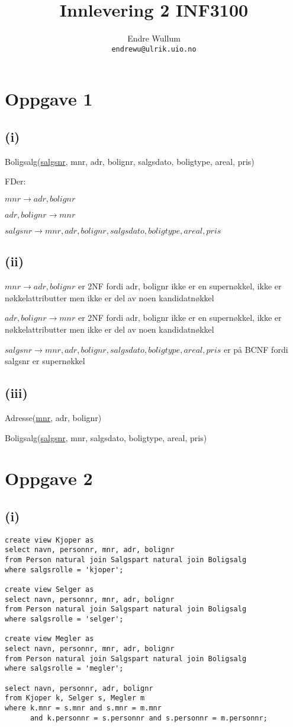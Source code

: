 \documentclass[12pt,norsk,a4paper]{article}
\title{Innlevering 2 INF3100}
\author{Endre Wullum\\ \texttt{endrewu@ulrik.uio.no}}
\begin{document}
\maketitle

\section*{Oppgave 1}
\subsection*{(i)}
Boligsalg(\underline{salgsnr}, mnr, adr, bolignr, salgsdato, boligtype, areal, pris)

FDer:

$mnr \rightarrow adr, bolignr$

$adr, bolignr \rightarrow mnr$ 

$salgsnr \rightarrow mnr, adr, bolignr, salgsdato, boligtype, areal, pris$

\subsection*{(ii)}
$mnr \rightarrow adr, bolignr$ er 2NF fordi adr, bolignr ikke er en supernøkkel, ikke er nøkkelattributter men ikke er del av noen kandidatnøkkel

$adr, bolignr \rightarrow mnr$ er 2NF fordi adr, bolignr ikke er en supernøkkel, ikke er nøkkelattributter men ikke er del av noen kandidatnøkkel 

$salgsnr \rightarrow mnr, adr, bolignr, salgsdato, boligtype, areal, pris$ er på BCNF fordi salgsnr er supernøkkel


\subsection*{(iii)}
Adresse(\underline{mnr}, adr, bolignr)

Boligsalg(\underline{salgsnr}, mnr, salgsdato, boligtype, areal, pris)


\section*{Oppgave 2}
\subsection*{(i)}
\begin{lstlisting}
create view Kjoper as
select navn, personnr, mnr, adr, bolignr
from Person natural join Salgspart natural join Boligsalg
where salgsrolle = 'kjoper';

create view Selger as
select navn, personnr, mnr, adr, bolignr
from Person natural join Salgspart natural join Boligsalg
where salgsrolle = 'selger';

create view Megler as
select navn, personnr, mnr, adr, bolignr
from Person natural join Salgspart natural join Boligsalg
where salgsrolle = 'megler';

select navn, personnr, adr, bolignr
from Kjoper k, Selger s, Megler m
where k.mnr = s.mnr and s.mnr = m.mnr 
      and k.personnr = s.personnr and s.personnr = m.personnr;
\end{lstlisting}
\end{document}
